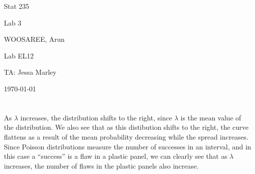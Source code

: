 \documentclass[letterpaper]{article}
\begin{document}
\begin{titlepage}
 \begin{center}
  \vspace*{1cm}
  \Huge
  Stat 235
  \vspace{1cm}
  
  Lab 3
  \vspace{1cm}
  
  WOOSAREE, Arun
  \vspace{1cm}
  
  \Huge
  Lab EL12
  \vspace{1cm}
  
  TA: Jessa Marley
  \vspace{1cm}
  
  \today
  \vfill
 \end{center}
\end{titlepage}

\section{}%
As $\lambda$ increases, the distribution shifts to the right, since $\lambda$ is
the mean value of the distribution. We also see that as this distibution shifts
to the right, the curve flattens as a result of the mean probability decreasing
while the spread increases. Since Poisson distributions measure the number of
successes in an interval, and in this case a ``success'' is a flaw in a plastic
panel, we can clearly see that as $\lambda$ increases, the number of flaws in
the plastic panels also increase.

\section{}%

\subsection{}%

\subsection{}%
\end{document}
